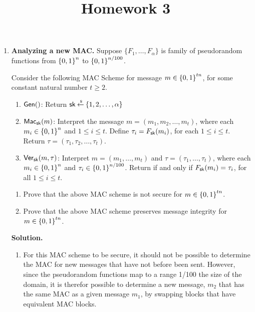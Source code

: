 \documentclass[11pt]{article}
\begin{document}
\title{Homework 3}

\date{}

\maketitle 

\thispagestyle{fancy}  
\pagestyle{fancy}      




\begin{enumerate}

\item {\bfseries Analyzing a new MAC.} 
  Suppose $\{F_1,\dotsc,F_\alpha\}$ is family of pseudorandom functions from ${\{0,1\}}^n$ to ${\{0,1\}}^{n/100}$. 
  
  Consider the following MAC Scheme for message $m \in {\{0,1\}}^{tn}$, for some constant natural number $t\geq 2$. 
  \begin{boxedalgo}
  \begin{enumerate}
  \item $\mathsf{Gen}()$: Return $\mathsf{sk}\mathbin{\stackrel{\mbox{\,\tiny \$}}{\gets}}\{1,2,\dotsc,\alpha\}$ 
  \item $\mathsf{Mac}_\mathsf{sk}(m)$: Interpret the message $m=(m_1,m_2,\dotsc,m_t)$, where each $m_i\in{\{0,1\}}^n$ and $1\leq i\leq t$. 
    Define $\tau_i = F_\mathsf{sk}(m_i)$, for each $1\leq i\leq t$. 
    Return $\tau = (\tau_1,\tau_2,\dotsc,\tau_t)$. 
  \item $\mathsf{Ver}_\mathsf{sk}(m,\tau)$: Interpret $m=(m_1,\dotsc,m_t)$ and $\tau=(\tau_1,\dotsc,\tau_t)$, where each $m_i\in{\{0,1\}}^n$ and $\tau_i\in{\{0,1\}}^{n/100}$. 
    Return  if and only if $F_\mathsf{sk}(m_i)=\tau_i$, for all $1\leq i\leq t$. 
  \end{enumerate}
  \end{boxedalgo} 
  
  \begin{enumerate}
  \item Prove that the above MAC scheme is not secure for $m\in{\{0,1\}}^{tn}$. 
  \item Prove that the above MAC scheme preserves message integrity for $m\in{\{0,1\}}^{tn}$. 
  \end{enumerate} 
  
  {\bfseries Solution.} 
  \begin{enumerate}
  \item For this MAC scheme to be secure, it should not be possible to determine the MAC for new messages that have not before been sent. However, since the pseudorandom functions map to a range 1/100 the size of the domain, it is therefor possible to determine a new message, $m_2$ that has the same MAC as a given message $m_1$, by swapping blocks that have equivalent MAC blocks.
  

\end{enumerate}
\end{enumerate}
\end{document}
